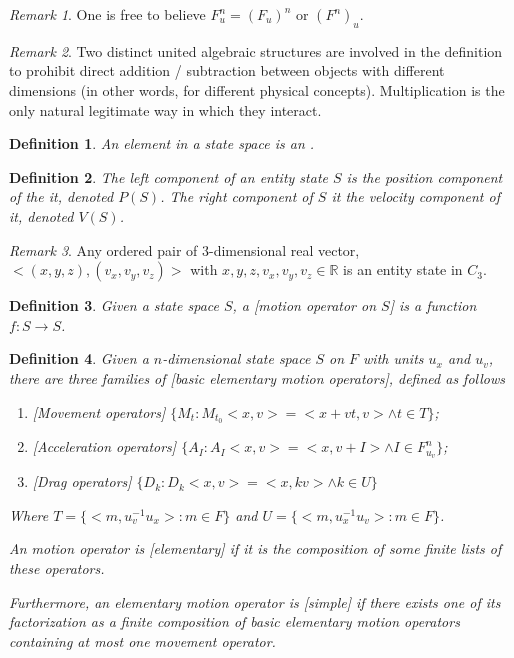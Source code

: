 \documentclass{book}
\newtheorem{definition}{Definition}
\theoremstyle{definition}\newtheorem{mechanism}{Mechanism}
\theoremstyle{remark}\newtheorem*{remark}{Remark}
\begin{document}
\begin{remark}
	One is free to believe $F_u^n = (F_u)^n$ or $(F^n)_u$.
\end{remark}

\begin{remark}
	Two distinct united algebraic structures are involved in the definition to prohibit direct addition / subtraction between objects with different dimensions (in other words, for different physical concepts). Multiplication is the only natural legitimate way in which they interact.
\end{remark}

\begin{definition}
	An element in a state space is an .
\end{definition}

\begin{definition}
	The left component of an entity state $S$ is the position component of the it, denoted $P(S)$. The right component of $S$ it the velocity component of it, denoted $V(S)$.
\end{definition}

\begin{remark}
	Any ordered pair of $3$-dimensional real vector, $<(x, y, z), (v_x, v_y, v_z)>$ with $x, y, z, v_x, v_y, v_z \in \mathbb{R}$ is an entity state in $C_3$.
\end{remark}

\begin{definition}
	Given a state space $S$, a [motion operator on $S$] is a function $f: S\to S$.
\end{definition}

\begin{definition}
	Given a $n$-dimensional state space $S$ on $F$ with units $u_x$ and $u_v$, there are three families of [basic elementary motion operators], defined as follows
	
	\begin{enumerate}
		\item {[Movement operators]} $\{M_{t}: M_{t_0}<x, v> = <x + vt, v> \land t \in T\}$;
		\item {[Acceleration operators]} $\{A_{I}: A_{I}<x, v> = <x, v + I> \land I\in F_{u_v}^n\}$;
		\item {[Drag operators]} $\{D_k: D_k<x, v> = <x, kv> \land k\in U\}$
	\end{enumerate}
	
	Where $T = \{<m, u_v^{-1}u_x>: m\in F\}$ and $U = \{<m, u_x^{-1}u_v>: m\in F\}$.
	
	An motion operator is [elementary] if it is the composition of some finite lists of these operators. 
	
	Furthermore, an elementary motion operator is [simple] if there exists one of its factorization as a finite composition of basic elementary motion operators containing at most one movement operator.
\end{definition}
\end{document}
